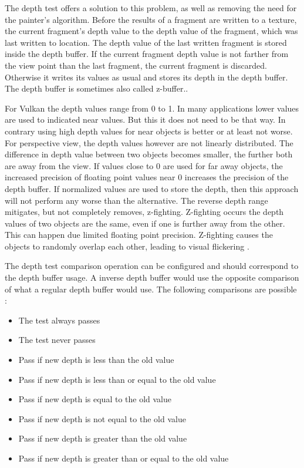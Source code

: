 The depth test offers a solution to this problem, as well as removing the need for the painter's algorithm. Before the results of a fragment are written to a texture, the current fragment's depth value to the depth value of the fragment, which was last written to location. The depth value of the last written fragment is stored inside the depth buffer. If the current fragment depth value is not farther from the view point than the last fragment, the current fragment is discarded. Otherwise it writes its values as usual and stores its depth in the depth buffer. The depth buffer is sometimes also called z-buffer.\cite{akine:2018:realtime}.

For Vulkan the depth values range from 0 to 1.  In many applications lower values are used to indicated near values. But this it does not need to be that way. In contrary using high depth values for near objects is better or at least not worse. For perspective view, the depth values however are not linearly distributed. The difference in depth value between two objects becomes smaller, the further both are away from the view. If values close to 0 are used for far away objects, the increased precision of floating point values near 0 increases the precision of the depth buffer. If normalized values are used to store the depth, then this approach will not perform any worse than the alternative\cite{lapidous:1999:optimal, nvidia:inversez}. The reverse depth range mitigates, but not completely removes, z-fighting. Z-fighting occurs the depth values of two objects are the same, even if one is further away from  the other. This can happen due limited floating point precision. Z-fighting causes the objects to randomly overlap each other, leading to visual flickering \cite{akine:2018:realtime}.

The depth test comparison operation can be configured and should correspond to the depth buffer usage. A inverse depth buffer would use the opposite comparison of what a regular depth buffer would use. The following comparisons are possible \cite{sellers:vulkanprogramming}:
\begin{itemize}
	\item The test always passes
	\item The test never passes
	\item Pass if new depth is less than the old value
	\item Pass if new depth is less than or equal to  the old value
	\item Pass if new depth is equal to the old value
	\item Pass if new depth is not equal to the old value
	\item Pass if new depth is greater than the old value
	\item Pass if new depth is greater than or equal to  the old value	
\end{itemize}

